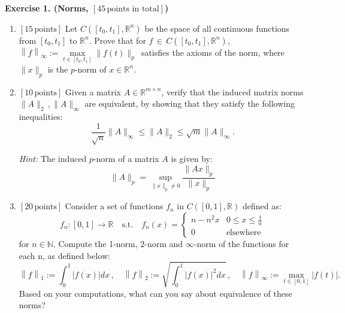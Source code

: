 \documentclass[fleqn, 10.5pt, a4paper]{article}
\def\R{{\mathbb R}}
\def\N{{\mathbb N}}
\theoremstyle{definition}
\numberwithin{equation}{section}
\begin{document}
\noindent
{\bf Exercise 1. (Norms, {\bf$[45\, \text{points in total}]$})}
\noindent
\begin{enumerate}
\item {\bf$[15\, \text{points}]$}
Let $C([t_0, t_1], \R^n)$ be the space of all continuous functions from $[t_0, t_1]$ to $\R^n$. Prove that for $f \, \in \, C([t_0, t_1], \R^n)$,
 $\left\lVert f \right\rVert_\infty := \max\limits_{t \in [t_0, t_1]} \|f(t)\|_p \, $ satisfies the axioms of the norm, where $\|x\|_p$ is the $p$-norm of $x \in \R^n$.

\item {\bf$[10\, \text{points}]$}
Given a matrix $A \in \R^{m \times n}$, verify that the induced matrix norms $\|A\|_2 \, ,\|A\|_\infty$ are equivalent, by showing that they satisfy the following inequalities: 
\begin{displaymath}
\dfrac{1}{\sqrt{n}} \|A\|_\infty \leq \|A\|_2 \leq \sqrt{m} \|A\|_\infty.
\end{displaymath}

{\em Hint:} The induced $p$-norm of a matrix $A$ is given by:
\begin{displaymath}
\|A\|_p=\sup\limits_{\|x\|_p \neq 0} \dfrac{\|Ax\|_p}{\|x\|_p}
\end{displaymath}

\item {\bf$[20\, \text{points}]$}
Consider a set of functions $f_n$ in $C([0,1], \R)$ defined as:
\begin{displaymath}
f_n:[0,1] \rightarrow \R \quad\text{s.t.}\quad
f_n(x) = 
\begin{cases}
n -n^2x & 0\leq x\leq \frac{1}{n}\\
0 & \text{elsewhere}
\end{cases}
\end{displaymath}
for $n\in\N$. Compute the 1-norm, 2-norm and $\infty$-norm of the functions for each n, as defined below:
\begin{displaymath}
\left\lVert f \right\rVert_1 := \int_0^1 \left\lvert f(x) \right\rvert dx\, , \quad
\left\lVert f \right\rVert_2 := \sqrt{\int_0^1 \left\lvert f(x) \right\rvert^2 dx}\, , \quad
\left\lVert f \right\rVert_\infty := \max\limits_{t \in [0, 1]} |f(t)|.
\end{displaymath}
Based on your computations, what can you say about equivalence of these norms?  
\end{enumerate} 
\end{document}
